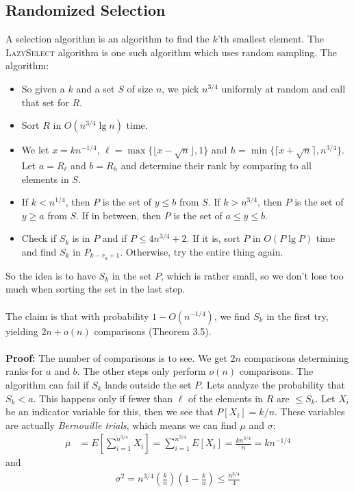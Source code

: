 \documentclass[a4paper, fleqn]{article}
\begin{document}
\subsection*{Randomized Selection}
A selection algorithm is an algorithm to find the $k$'th smallest element. The \textsc{LazySelect} algorithm is one such algorithm which uses random sampling. The algorithm:
\begin{itemize}
  \item So given a $k$ and a set $S$ of size $n$, we pick $n^{3/4}$ uniformly at random and call that set for $R$.
  \item Sort $R$ in $O(n^{3/4}\lg n)$ time.
  \item We let $x=kn^{-1/4}$, $\ell=\max \{\lfloor x-\sqrt{n}\rfloor, 1\}$ and $h=\min\{\lceil x+\sqrt{n}\rceil, n^{3/4}\}$. Let $a=R_{\ell}$ and $b=R_h$ and determine their rank by comparing to all elements in $S$.
  \item If $k<n^{1/4}$, then $P$ is the set of $y\leq b$ from $S$. If $k>n^{3/4}$, then $P$ is the set of $y\geq a$ from $S$. If in between, then $P$ is the set of $a\leq y\leq b$.
  \item Check if $S_k$ is in $P$ and if $P\leq 4n^{3/4}+2$. If it is, sort $P$ in $O(P\lg P)$ time and find $S_k$ in $P_{k-r_a+1}$. Otherwise, try the entire thing again.
\end{itemize}
So the idea is to have $S_k$ in the set $P$, which is rather small, so we don't lose too much when sorting the set in the last step.\\
\\
The claim is that with probability $1-O(n^{-1/4})$, we find $S_k$ in the first try, yielding $2n+o(n)$ comparisons (Theorem 3.5).\\
\\
\textbf{Proof:} The number of comparisons is to see. We get $2n$ comparisons determining ranks for $a$ and $b$. The other steps only perform $o(n)$ comparisons. The algorithm can fail if $S_k$ lands outside the set $P$. Lets analyze the probability that $S_k<a$. This happens only if fewer than $\ell$ of the elements in $R$ are $\leq S_k$. Let $X_i$ be an indicator variable for this, then we see that $P[X_i]=k/n$. These variables are actually \textit{Bernouille trials}, which means we can find $\mu$ and $\sigma$:
\begin{align*}
  \mu&=E\left[ \sum_{i=1}^{n^{3/4}} X_i \right] = \sum_{i=1}^{n^{3/4}} E[X_i] =\frac{kn^{3/4}}{n}=kn^{-1/4}
\end{align*}
and
\begin{align*}
  \sigma^2 = n^{3/4}\left( \frac{k}{n} \right) \left( 1-\frac{k}{n} \right) \leq \frac{n^{3/4}}{4}
\end{align*}
\end{document}
